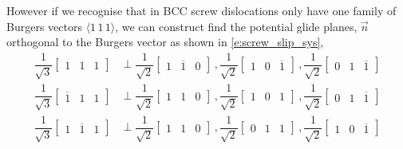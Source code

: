However if we recognise that in BCC screw dislocations only have one family of Burgers vectors $ \langle 1\,1\,1 \rangle $, we can construct find the potential glide planes, $ \vec{n} $ orthogonal to the Burgers vector as shown in \cref{e:screw_slip_sys},
\begin{subequations}\label{e:screw_slip_sys}
	\begin{align}
		\dfrac{1}{\sqrt{3}}
		\begin{bmatrix}
			1 & 1 & 1
		\end{bmatrix} &\perp 	\dfrac{1}{\sqrt{2}}
								\begin{bmatrix}
									1 & \overline{1} & 0
								\end{bmatrix}\,,
								\dfrac{1}{\sqrt{2}}
								\begin{bmatrix}
									1 & 0 & \overline{1}
								\end{bmatrix}\,,
								\dfrac{1}{\sqrt{2}}
								\begin{bmatrix}
									0 & 1 & \overline{1}
								\end{bmatrix}\\
		\dfrac{1}{\sqrt{3}}
		\begin{bmatrix}
			\overline{1} & 1 & 1
		\end{bmatrix} &\perp 	\dfrac{1}{\sqrt{2}}
								\begin{bmatrix}
									1 & 1 & 0
								\end{bmatrix}\,,
								\dfrac{1}{\sqrt{2}}
								\begin{bmatrix}
									1 & 0 & 1
								\end{bmatrix}\,,
								\dfrac{1}{\sqrt{2}}
								\begin{bmatrix}
									0 & 1 & \overline{1}
								\end{bmatrix}\\
		\dfrac{1}{\sqrt{3}}
		\begin{bmatrix}
			1 & \overline{1} & 1
		\end{bmatrix} &\perp 	\dfrac{1}{\sqrt{2}}
								\begin{bmatrix}
									1 & 1 & 0
								\end{bmatrix}\,,
								\dfrac{1}{\sqrt{2}}
								\begin{bmatrix}
									0 & 1 & 1
								\end{bmatrix}\,,
								\dfrac{1}{\sqrt{2}}
								\begin{bmatrix}
								1 & 0 & \overline{1}
								\end{bmatrix}\\

\end{align}
\end{subequations}
